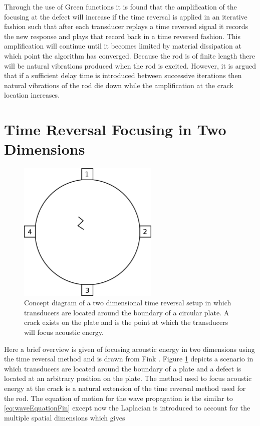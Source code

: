 
Through the use of Green functions it is found that the amplification of the focusing at the defect will increase if the time reversal is applied in an iterative fashion such that after each transducer replays a time reversed signal it records the new response and plays that record back in a time reversed fashion. This amplification will continue until it becomes limited by material dissipation at which point the algorithm has converged. Because the rod is of finite length there will be natural vibrations produced when the rod is excited. However, it is argued that if a sufficient delay time is introduced between successive iterations then natural vibrations of the rod die down while the amplification at the crack location increases.

\section{Time Reversal Focusing in Two Dimensions}

\begin{figure}[ht!]
\centering
\includegraphics[width=0.6\textwidth]{eps_pics/2dTr.eps}
\caption{Concept diagram of a two dimensional time reversal setup in which transducers are located around the boundary of a circular plate. A crack exists on the plate and is the point at which the transducers will focus acoustic energy.
	 \label{fig:2dTr}} 
\end{figure}

Here a brief overview is given of focusing acoustic energy in two dimensions using the time reversal method and is drawn from Fink \cite{Fink1992}. Figure \ref{fig:2dTr} depicts a scenario in which transducers are located around the boundary of a plate and a defect is located at an arbitrary position on the plate. The method used to focus acoustic energy at the crack is a natural extension of the time reversal method used for the rod. The equation of motion for the wave propagation is the similar to \ref{eq:waveEquationFin} except now the Laplacian is introduced to account for the multiple spatial dimensions which gives

